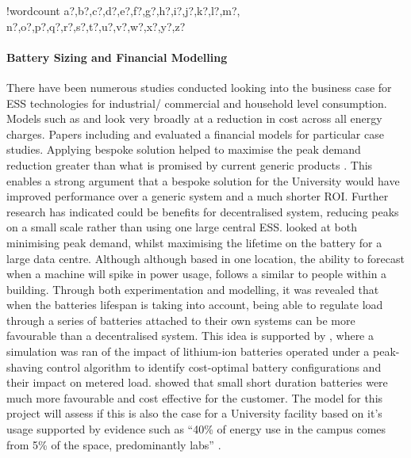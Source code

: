 \documentclass[10pt]{article}
\let\oldparagraph\paragraph
\renewcommand{\paragraph}[1]{\oldparagraph{#1}\mbox{}}
\newcounter{words}
\newenvironment{counted}{%
  \setcounter{words}{0}
  \SearchList!{wordcount}{\stepcounter{words}}
    {a?,b?,c?,d?,e?,f?,g?,h?,i?,j?,k?,l?,m?,
    n?,o?,p?,q?,r?,s?,t?,u?,v?,w?,x?,y?,z?}
  \UndoBoundary{'}
  \SearchOrder{p;}}{%
  \StopSearching}
\begin{document}
\begin{counted}
\paragraph{Battery Sizing and Financial
Modelling}\label{battery-sizing-and-financial-modelling}

There have been numerous studies conducted looking into the business
case for ESS technologies for industrial/ commercial and household level
consumption. Models such as \cite{7555795} and \cite{7555793} look very
broadly at a reduction in cost across all energy charges. Papers
including \cite{1300158} and \cite{6175723} evaluated a financial models
for particular case studies. Applying bespoke solution helped to
maximise the peak demand reduction greater than what is promised by
current generic products \cite{abbpeakshave}. This enables a strong
argument that a bespoke solution for the University would have improved
performance over a generic system and a much shorter ROI. Further
research has indicated could be benefits for decentralised system,
reducing peaks on a small scale rather than using one large central ESS.
\cite{6604477} looked at both minimising peak demand, whilst maximising
the lifetime on the battery for a large data centre. Although although
based in one location, the ability to forecast when a machine will spike
in power usage, follows a similar to people within a building. Through
both experimentation and modelling, it was revealed that when the
batteries lifespan is taking into account, being able to regulate load
through a series of batteries attached to their own systems can be more
favourable than a decentralised system. This idea is supported by
\cite{Demonstr51:online}, where a simulation was ran of the impact of
lithium-ion batteries operated under a peak-shaving control algorithm to
identify cost-optimal battery configurations and their impact on metered
load. \cite{Demonstr51:online} showed that small short duration
batteries were much more favourable and cost effective for the customer.
The model for this project will assess if this is also the case for a
University facility based on it's usage supported by evidence such as
``40\% of energy use in the campus comes from 5\% of the space,
predominantly labs'' \cite{brentemail} .


\end{counted}
\end{document}
